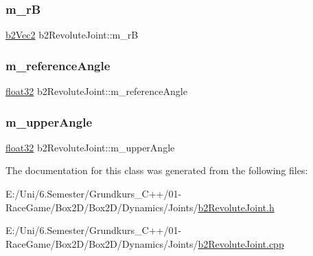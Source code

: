 \mbox{\label{classb2_revolute_joint_afd72e453f92aa3214701a201c8f9dfe9}} 
\subsubsection{\texorpdfstring{m\_rB}{m\_rB}}
{\footnotesize\ttfamily \mbox{\hyperlink{structb2_vec2}{b2\+Vec2}} b2\+Revolute\+Joint\+::m\+\_\+rB\hspace{0.3cm}{\ttfamily [protected]}}

\mbox{\label{classb2_revolute_joint_a7648b770a9165ee9cd97edcf2df6ed9e}} 
\subsubsection{\texorpdfstring{m\_referenceAngle}{m\_referenceAngle}}
{\footnotesize\ttfamily \mbox{\hyperlink{b2_settings_8h_aacdc525d6f7bddb3ae95d5c311bd06a1}{float32}} b2\+Revolute\+Joint\+::m\+\_\+reference\+Angle\hspace{0.3cm}{\ttfamily [protected]}}

\mbox{\label{classb2_revolute_joint_adf7a2ab69e1e7a72697a2c9d92877c52}} 
\subsubsection{\texorpdfstring{m\_upperAngle}{m\_upperAngle}}
{\footnotesize\ttfamily \mbox{\hyperlink{b2_settings_8h_aacdc525d6f7bddb3ae95d5c311bd06a1}{float32}} b2\+Revolute\+Joint\+::m\+\_\+upper\+Angle\hspace{0.3cm}{\ttfamily [protected]}}



The documentation for this class was generated from the following files\+:\begin{DoxyCompactItemize}
\item 
E\+:/\+Uni/6.\+Semester/\+Grundkurs\+\_\+\+C++/01-\/\+Race\+Game/\+Box2\+D/\+Box2\+D/\+Dynamics/\+Joints/\mbox{\hyperlink{b2_revolute_joint_8h}{b2\+Revolute\+Joint.\+h}}\item 
E\+:/\+Uni/6.\+Semester/\+Grundkurs\+\_\+\+C++/01-\/\+Race\+Game/\+Box2\+D/\+Box2\+D/\+Dynamics/\+Joints/\mbox{\hyperlink{b2_revolute_joint_8cpp}{b2\+Revolute\+Joint.\+cpp}}\end{DoxyCompactItemize}
